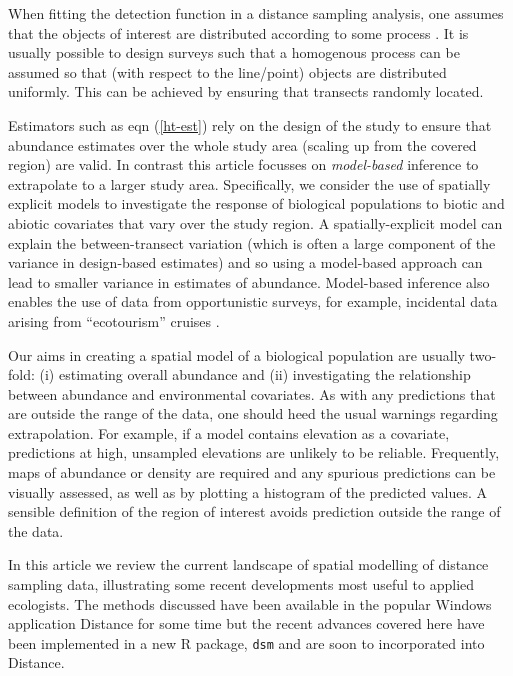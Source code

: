 \documentclass[a4paper,12pt]{article}
\begin{document}
When fitting the detection function in a distance sampling analysis, one assumes that the objects of interest are distributed according to some process \citep[Section 2.1]{Buckland:2001vm}. It is usually possible to design surveys such that a homogenous process can be assumed so that (with respect to the line/point) objects are distributed uniformly. This can be achieved by ensuring that  transects randomly located.

Estimators such as eqn (\ref{ht-est}) rely on the design of the study to ensure that abundance estimates over the whole study area (scaling up from the covered region) are valid. In contrast this article focusses on \textit{model-based} inference to extrapolate to a larger study area. Specifically, we consider the use of spatially explicit models to investigate the response of biological populations to biotic and abiotic covariates that vary over the study region. A spatially-explicit model can explain the between-transect variation (which is often a large component of the variance in design-based estimates) and so using a model-based approach can lead to smaller variance in estimates of abundance. Model-based inference also enables the use of data from opportunistic surveys, for example, incidental data arising from ``ecotourism'' cruises \citep{Williams:2006tz}. 

Our aims in creating a spatial model of a biological population are usually two-fold: (i) estimating overall abundance and (ii) investigating the relationship between abundance and environmental covariates. As with any predictions that are outside the range of the data, one should heed the usual warnings regarding extrapolation. For example, if a model contains elevation as a covariate, predictions at high, unsampled elevations are unlikely to be reliable. Frequently, maps of abundance or density are required and any spurious predictions can be visually assessed, as well as by plotting a histogram of the predicted values. A sensible definition of the region of interest avoids prediction outside the range of the data.

In this article we review the current landscape of spatial modelling of distance sampling data, illustrating some recent developments most useful to applied ecologists. The methods discussed have been available in the popular Windows application Distance \citep{Thomas:2010cf} for some time but the recent advances covered here have been implemented in a new \textsf{R} package, \texttt{dsm} \citep{dsm-package}  and are soon to incorporated into Distance.
\end{document}
